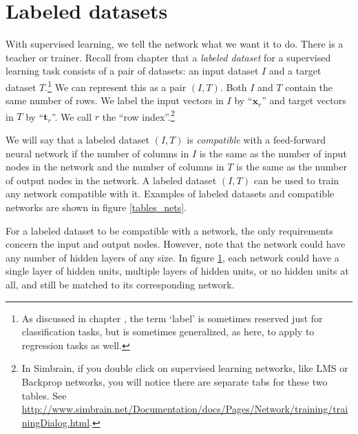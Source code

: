 
\section{Labeled datasets}\label{supervised_datasets}

With supervised learning, we tell the network what we want it to do. There is a teacher or trainer. Recall from chapter  that a \emph{labeled dataset} for a supervised learning task consists of a pair of datasets: an input dataset $I$ and a target dataset $T$.\footnote{As discussed in chapter , the term `label' is sometimes reserved just for classification tasks, but is sometimes generalized, as here, to apply to regression tasks as well.} We can represent this as a pair $(I,T)$. Both $I$ and $T$ contain the same number of rows. We label the input vectors in $I$ by ``$\textbf{x}_r$''  and target vectors in $T$ by ``$\textbf{t}_r$''. We call $r$ the ``row index''.\footnote{In Simbrain, if you double click on supervised learning networks, like LMS or Backprop networks, you will notice there are separate tabs for these two tables. See \url{http://www.simbrain.net/Documentation/docs/Pages/Network/training/trainingDialog.html}. }   

We will say that a labeled dataset $(I,T)$ is \emph{compatible} with a feed-forward neural network if the number of columns in $I$ is the same as the number of input nodes in the network and the number of columns in $T$ is the same as the number of output nodes in the network. A labeled dataset $(I,T)$ can be used to train any network compatible with it. Examples of labeled datasets and compatible networks are shown in figure \ref{tables_nets}. 
 
For a labeled dataset to be compatible with a network, the only requirements concern the input and output nodes. However, note that the network could have any number of hidden layers of any size. In figure \ref{supervised_datasets}, each network could have a single layer of hidden units, multiple layers of hidden units, or no hidden units at all, and still be matched to its corresponding network.


